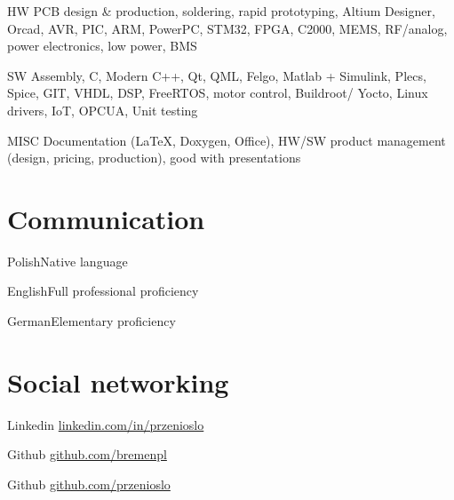 \documentclass{tccv}
\begin{document}
\begin{factlist}

\item{HW}
     {PCB design \& production, soldering, rapid prototyping, Altium Designer, Orcad, AVR, PIC, ARM, PowerPC, STM32, FPGA, C2000, MEMS, RF/analog, power electronics, low power, BMS}

\item{SW}
     {Assembly, C, Modern C++, Qt, QML, Felgo, Matlab + Simulink, Plecs, Spice, GIT, VHDL, DSP, FreeRTOS, motor control, Buildroot/ Yocto, Linux drivers, IoT, OPCUA, Unit testing}
     
\item{MISC}
     {Documentation (\LaTeX, Doxygen, Office), HW/SW product management (design, pricing, production), good with presentations}

\end{factlist}

\section{Communication}

\begin{factlist}
\item{Polish}{Native language}
\item{English}{Full professional proficiency}
\item{German}{Elementary proficiency}
\end{factlist}

\section{Social networking}

\begin{factlist}

\item{Linkedin}
     {\href{http://pl.linkedin.com/in/przenioslo}{linkedin.com/in/przenioslo}}
     
\item{Github}
     {\href{http://github.com/bremenpl}{github.com/bremenpl}}
     
\item{Github}
     {\href{http://github.com/przenioslo}{github.com/przenioslo}}

\end{factlist} 

\vspace*{\fill} %
\end{document}
